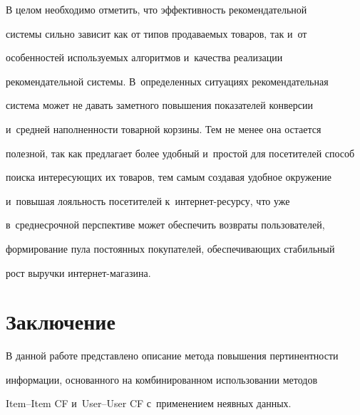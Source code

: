  В целом необходимо отметить, что эффективность рекомендательной 


системы сильно зависит как от типов продаваемых товаров, так и~от 


особенностей используемых алгоритмов и~качества реализации 


рекомендательной системы. В~определенных ситуациях рекомендательная 


система может не давать заметного повышения показателей конверсии 


и~средней наполненности товарной корзины. Тем не менее она остается 


полезной, так как предлагает более удобный и~простой для посетителей способ 


поиска интересующих их товаров, тем самым создавая удобное окружение 


и~повышая лояльность посетителей к~ин\-тер\-нет-ре\-сур\-су, что уже 


в~среднесрочной перспективе может обеспечить возвраты пользователей, 


формирование пула постоянных покупателей, обеспечивающих стабильный 


рост выручки ин\-тер\-нет-ма\-га\-зина.


  


\vspace*{-6pt}





\section{Заключение}





\vspace*{-2pt}





  В данной работе представлено описание метода повышения пертинентности 


информации, основанного на комбинированном использовании методов  


Item--Item CF и~User--User CF с~применением неявных данных. 


